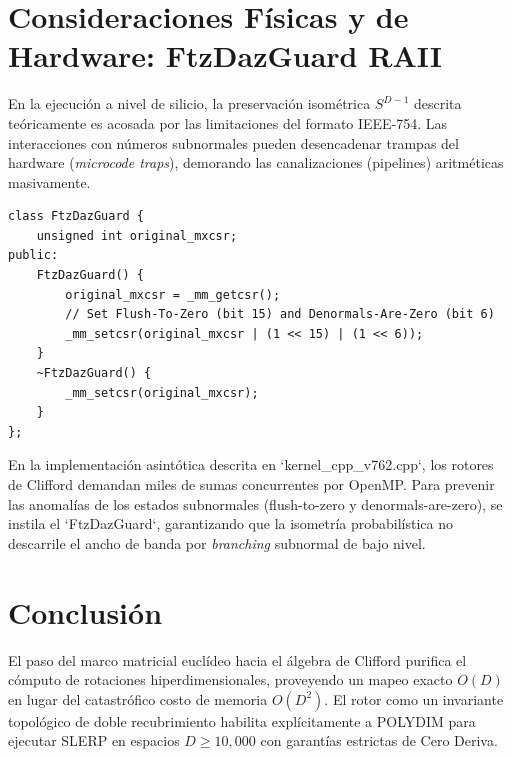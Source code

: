 \section{Consideraciones Físicas y de Hardware: FtzDazGuard RAII}
En la ejecución a nivel de silicio, la preservación isométrica $S^{D-1}$ descrita teóricamente es acosada por las limitaciones del formato IEEE-754. Las interacciones con números subnormales pueden desencadenar trampas del hardware (\textit{microcode traps}), demorando las canalizaciones (pipelines) aritméticas masivamente.
\begin{verbatim}
class FtzDazGuard {
    unsigned int original_mxcsr;
public:
    FtzDazGuard() {
        original_mxcsr = _mm_getcsr();
        // Set Flush-To-Zero (bit 15) and Denormals-Are-Zero (bit 6)
        _mm_setcsr(original_mxcsr | (1 << 15) | (1 << 6));
    }
    ~FtzDazGuard() {
        _mm_setcsr(original_mxcsr);
    }
};
\end{verbatim}
En la implementación asintótica descrita en `kernel_cpp_v762.cpp`, los rotores de Clifford demandan miles de sumas concurrentes por OpenMP. Para prevenir las anomalías de los estados subnormales (flush-to-zero y denormals-are-zero), se instila el `FtzDazGuard`, garantizando que la isometría probabilística no descarrile el ancho de banda por \textit{branching} subnormal de bajo nivel.

\section{Conclusión}
El paso del marco matricial euclídeo hacia el álgebra de Clifford purifica el cómputo de rotaciones hiperdimensionales, proveyendo un mapeo exacto $O(D)$ en lugar del catastrófico costo de memoria $O(D^2)$. El rotor como un invariante topológico de doble recubrimiento habilita explícitamente a POLYDIM para ejecutar SLERP en espacios $D \ge 10,000$ con garantías estrictas de Cero Deriva.
